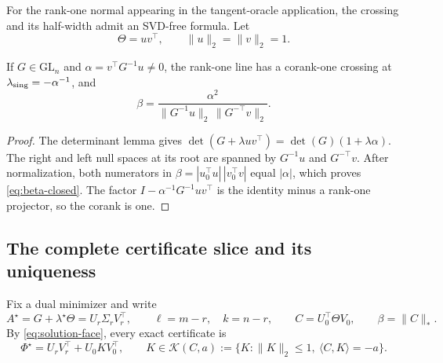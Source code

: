 For the rank-one normal appearing in the tangent-oracle application, the
crossing and its half-width admit an SVD-free formula.  Let
\begin{equation}
 \Theta=uv^\top,
 \qquad \|u\|_2=\|v\|_2=1.
 \label{eq:rank-one-normal}
\end{equation}

\begin{proposition}
\label{prop:beta-closed}
If \(G\in\mathrm{GL}_n\) and
\(\alpha=v^\top G^{-1}u\ne0\), the rank-one line has a corank-one crossing at
\(\lambda_{\rm sing}=-\alpha^{-1}\), and
\begin{equation}
 \beta=
 \frac{\alpha^2}
 {\|G^{-1}u\|_2\,\|G^{-\top}v\|_2}.
 \label{eq:beta-closed}
\end{equation}
\end{proposition}

\begin{proof}
The determinant lemma gives
\(\det(G+\lambda uv^\top)=\det(G)(1+\lambda\alpha)\).  The right and left
null spaces at its root are spanned by \(G^{-1}u\) and \(G^{-\top}v\).
After normalization, both numerators in
\(\beta=|u_0^\top u|\,|v_0^\top v|\) equal \(|\alpha|\), which proves
\eqref{eq:beta-closed}.  The factor
\(I-\alpha^{-1}G^{-1}uv^\top\) is the identity minus a rank-one projector,
so the corank is one.
\end{proof}

\subsection{The complete certificate slice and its uniqueness}

Fix a dual minimizer and write
\[
 A^\star=G+\lambda^\star\Theta=U_r\Sigma_rV_r^\top,
 \qquad
 \ell=m-r,\quad k=n-r,
 \qquad
 C=U_0^\top\Theta V_0,\qquad \beta=\|C\|_*.
\]
By \eqref{eq:solution-face}, every exact certificate is
\begin{equation}
 \Phi^\star=U_rV_r^\top+U_0KV_0^\top,
 \qquad
 K\in\mathcal K(C,a):=
 \{K:\|K\|_2\le1,\ \langle C,K\rangle=-a\}.
 \label{eq:all-directions}
\end{equation}

